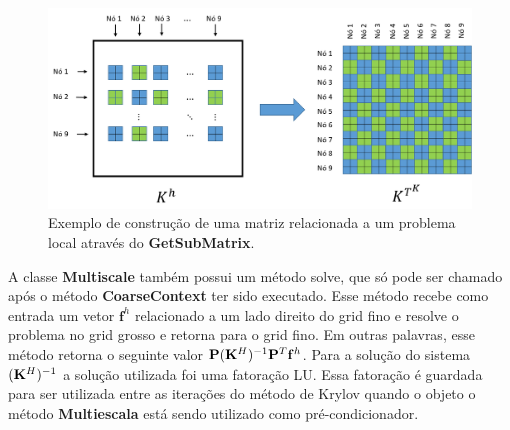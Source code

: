 \begin{figure}[!htbp]
\centering
\includegraphics[width=\textwidth]{chap07/figs/submatrix.png}
\caption{Exemplo de construção de uma matriz relacionada a um problema local através do \textbf{GetSubMatrix}.}
\label{fig:submatrix}
\end{figure}


A classe \textbf{Multiscale} também possui um método solve, que só pode ser chamado após o método \textbf{CoarseContext} ter sido executado. Esse método recebe como entrada um vetor $\mathbf{f}^h$ relacionado a um lado direito do grid fino e resolve o problema no grid grosso e retorna para o grid fino. Em outras palavras, esse método retorna o seguinte valor $\mathbf{P}(\mathbf{K}^H)^{-1}\mathbf{P}^T \mathbf{f}^h$. Para a solução do sistema $(\mathbf{K}^H)^{-1}$ a solução utilizada foi uma fatoração LU. Essa fatoração é guardada para ser utilizada entre as iterações do método de Krylov quando o objeto o método \textbf{Multiescala} está sendo utilizado como pré-condicionador.

                                                                                   